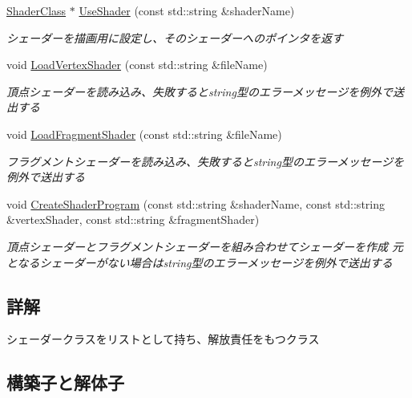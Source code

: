 \begin{DoxyCompactItemize}
\mbox{\hyperlink{class_k___graphics_1_1_shader_class}{Shader\+Class}} $\ast$ \mbox{\hyperlink{class_k___graphics_1_1_shader_list_ad903d8c4daca2f2296434afd5694a4c5}{Use\+Shader}} (const std\+::string \&shader\+Name)
\begin{DoxyCompactList}\small\item\em シェーダーを描画用に設定し、そのシェーダーへのポインタを返す \end{DoxyCompactList}\item 
void \mbox{\hyperlink{class_k___graphics_1_1_shader_list_a5caa3b1fa44d6f4459e0471ead6c87e0}{Load\+Vertex\+Shader}} (const std\+::string \&file\+Name)
\begin{DoxyCompactList}\small\item\em 頂点シェーダーを読み込み、失敗するとstring型のエラーメッセージを例外で送出する \end{DoxyCompactList}\item 
void \mbox{\hyperlink{class_k___graphics_1_1_shader_list_a5daf641dfbc9472b9fb37126cfad27c7}{Load\+Fragment\+Shader}} (const std\+::string \&file\+Name)
\begin{DoxyCompactList}\small\item\em フラグメントシェーダーを読み込み、失敗するとstring型のエラーメッセージを例外で送出する \end{DoxyCompactList}\item 
void \mbox{\hyperlink{class_k___graphics_1_1_shader_list_ad59998f21d1830a48ce6a336813218aa}{Create\+Shader\+Program}} (const std\+::string \&shader\+Name, const std\+::string \&vertex\+Shader, const std\+::string \&fragment\+Shader)
\begin{DoxyCompactList}\small\item\em 頂点シェーダーとフラグメントシェーダーを組み合わせてシェーダーを作成 元となるシェーダーがない場合はstring型のエラーメッセージを例外で送出する \end{DoxyCompactList}\end{DoxyCompactItemize}


\subsection{詳解}
シェーダークラスをリストとして持ち、解放責任をもつクラス 

\subsection{構築子と解体子}
\mbox{\label{class_k___graphics_1_1_shader_list_a93645f83598573fa2695489fcac10b6f}} 
